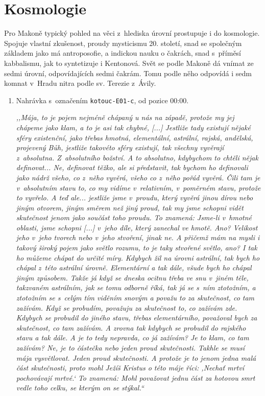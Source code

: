\section{Kosmologie}

Pro Makoně typický pohled na věci z~hlediska úrovní prostupuje i do kosmologie.
Spojuje vlastní zkušenost, proudy mysticismu 20. století, snad se společným
základem jako má antroposofie\cite{Bezdek2009thesis}, a indickou nauku o
čakrách\cite{atwell2013osi}, snad s~příměsí kabbalismu, jak to syntetizuje i
Kentonová\cite{kenton2015kabbalistic}. Svět se podle Makoně dá vnímat ze sedmi
úrovní, odpovídajících sedmi čakrám. Tomu podle něho odpovídá i sedm komnat v~Hradu
nitra podle sv. Terezie z~Ávily.

\begin{enumerate}

\item{
Nahrávka s~označením \texttt{kotouc-E01-c}, od pozice 00:00.

\textit{%
,,Mája, to je pojem nejméně chápaný u nás na západě, protože my jej chápeme jako
klam, a to je asi tak chybné, [...] Jestliže tady existují nějaké sféry
existenční, jako třebas hmotná, elementální, astrální, rajská, andělská,
projevený Bůh, jestliže takovéto sféry existují, tak všechny vyvěrají z~absolutna.
Z~absolutního božství. A to absolutno, kdybychom to chtěli nějak definovat...
Ne, definovat těžko, ale si představit, tak bychom ho definovali jako nádrž
všeho, co z~něho vyvěrá, všeho co z~něho pořád vyvěrá. Čili tam je v~absolutním
stavu to, co my vidíme v~relativním, v~poměrném stavu, protože to vyvřelo. A
teď ale... jestliže jsme v~proudu, který vyvěrá jinou dírou nebo jiným otvorem,
jiným směrem než jiný proud, tak my jsme schopni vidět skutečnost jenom jako
součást toho proudu. To znamená: Jsme-li v~hmotné oblasti, jsme schopni [...] v~jeho
díle, který zanechal ve hmotě. Ano? Velikost jeho v~jeho tvorech nebo v~jeho
stvoření, jinak ne. A přičemž mám na mysli i takový široký pojem jako světlo
rozumu, to je taky stvořené světlo, ano? I tak ho můžeme chápat do určité míry.
Kdybych žil na úrovni astrální, tak bych ho chápal z~této astrální úrovně.
Elementární a tak dále, všude bych ho chápal jiným způsobem. Takže já když se
dneska ocitnu třeba ve snu v~jiném těle, takzvaném astrálním, jak se tomu odborně
říká, tak já se s~ním ztotožním, a ztotožním se s~celým tím viděním snovým a
považu to za skutečnost, co tam zažívám. Když se probudím, považuju za
skutečnost to, co zažívám zde. Kdybych se probudil do jiného stavu, třebas
elementárního, považoval bych za skutečnost, co tam zažívám. A zrovna tak
kdybych se probudil do
rajského stavu a tak dále. A je to tedy nepravda, co já zažívám? Je to
klam, co tam zažívám? Ne, je to částečka nebo jeden proud skutečnosti.
Takhle se musí mája vysvětlovat. Jeden proud skutečnosti. A
protože je to jenom jedna malá část skutečnosti, proto mohl Ježíš Kristus o této
máje říci: ,Nechať mrtví pochovávají mrtvé.` To znamená: Mohl považovat jednu
část za hotovou smrt vedle toho celku, se kterým on se stýkal.``
}

}

\end{enumerate}

